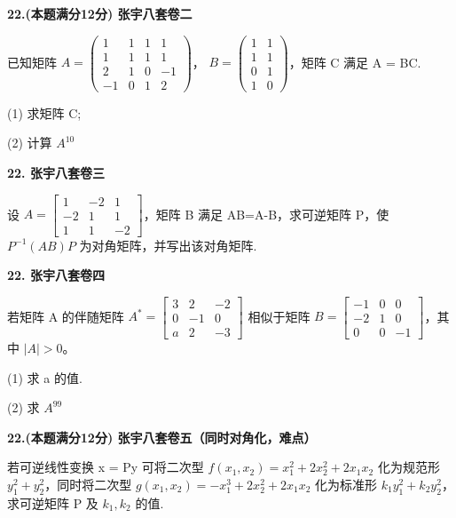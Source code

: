 \documentclass[a4paper,12pt]{article}
\begin{document}
\vspace{0.5cm}

\textbf{22.(本题满分12分) 张宇八套卷二}

已知矩阵 $A = \begin{pmatrix} 1 & 1 & 1 & 1 \\ 1 & 1 & 1 & 1 \\ 2 & 1 & 0 & -1 \\ -1 & 0 & 1 & 2 \end{pmatrix}$， $B = \begin{pmatrix} 1 & 1 \\ 1 & 1 \\ 0 & 1 \\ 1 & 0 \end{pmatrix}$，矩阵 C 满足 A = BC.

(1) 求矩阵 C;

(2) 计算 $A^{10}$

\vspace{0.5cm}

\textbf{22. 张宇八套卷三}

设 $A=\begin{bmatrix}1&-2&1\\ -2&1&1\\ 1&1&-2\end{bmatrix}$，矩阵 B 满足 AB=A-B，求可逆矩阵 P，使 $P^{-1}(AB)P$ 为对角矩阵，并写出该对角矩阵.

\vspace{0.5cm}

\textbf{22. 张宇八套卷四}

若矩阵 A 的伴随矩阵 $A^{*}=\begin{bmatrix}3&2&-2\\ 0&-1&0\\ a&2&-3\end{bmatrix}$ 相似于矩阵 $B=\begin{bmatrix}-1&0&0\\ -2&1&0\\ 0&0&-1\end{bmatrix}$，其中 $|A|>0$。

(1) 求 a 的值.

(2) 求 $A^{99}$

\vspace{0.5cm}

\textbf{22.(本题满分12分) 张宇八套卷五（同时对角化，难点）}

若可逆线性变换 x = Py 可将二次型 $f(x_{1}, x_{2}) = x_{1}^{2} + 2x_{2}^{2} + 2x_{1}x_{2}$ 化为规范形 $y_{1}^{2} + y_{2}^{2}$，同时将二次型 $g(x_{1}, x_{2}) = -x_{1}^{3} + 2x_{2}^{2} + 2x_{1}x_{2}$ 化为标准形 $k_{1}y_{1}^{2} + k_{2}y_{2}^{2}$，求可逆矩阵 P 及 $k_{1}, k_{2}$ 的值.
\end{document}
